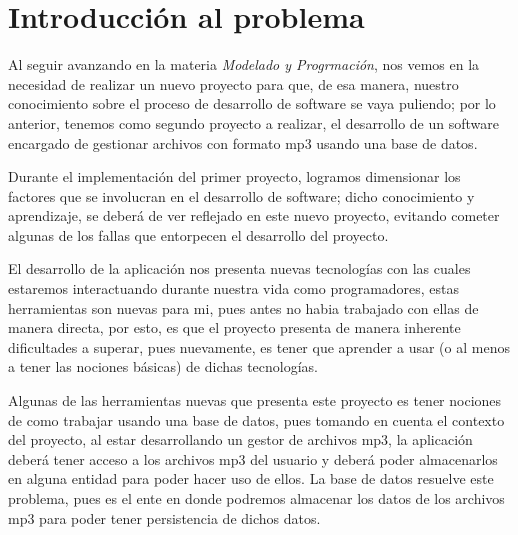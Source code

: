 \documentclass[10pt,letterpaper]{report}
\begin{document}
  \chapter{Introducción al problema}

\noindent  Al seguir avanzando en la materia \textit{Modelado y Progrmación}, nos vemos en la necesidad de realizar un nuevo proyecto para que, de esa manera, nuestro conocimiento sobre el proceso de desarrollo de software se vaya puliendo; por lo anterior, tenemos como segundo proyecto a realizar, el desarrollo de un software encargado de gestionar archivos con formato mp3 usando una base de datos. 

\vspace{0.2cm}

\noindent  Durante el implementación del primer proyecto, logramos dimensionar los factores que se involucran en el desarrollo de software; dicho conocimiento y aprendizaje, se deberá de ver reflejado en este nuevo proyecto, evitando cometer algunas de los fallas que entorpecen el desarrollo del proyecto.
\vspace{0.2cm}

\noindent El desarrollo de la aplicación nos presenta nuevas tecnologías con las cuales estaremos interactuando durante nuestra vida como programadores, estas herramientas son nuevas para mi, pues antes no habia trabajado con ellas de manera directa, por esto, es que el proyecto presenta de manera inherente dificultades a superar, pues nuevamente, es tener que aprender a usar (o al menos a tener las nociones básicas) de dichas tecnologías.
\vspace{0.2cm}

\noindent Algunas de las herramientas nuevas que presenta este proyecto es tener nociones de como trabajar usando una base de datos, pues tomando en cuenta el contexto del proyecto, al estar desarrollando un gestor de archivos mp3, la aplicación deberá tener acceso a los archivos mp3 del usuario y deberá poder almacenarlos en alguna entidad para poder hacer uso de ellos. La base de datos resuelve este problema, pues es el ente en donde podremos almacenar los datos de los archivos mp3 para poder tener persistencia de dichos datos.
\vspace{0.2cm}
\end{document}
